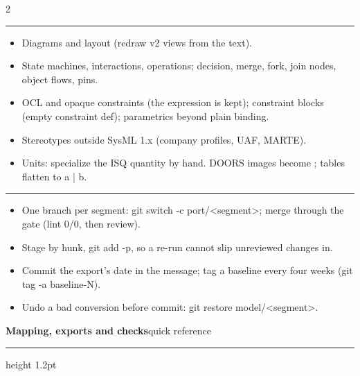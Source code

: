 \documentclass[letterpaper]{article}
\newcommand{\head}[1]{\par\vspace{7pt}{\sffamily\bfseries\large #1}\par\vspace{1pt}\hrule\vspace{4pt}}
\newcommand{\cmd}[1]{{\footnotesize\ttfamily #1}}
\begin{document}
\begin{multicols}{2}
\head{Becomes a TODO (finish by hand)}
\begin{itemize}
\item Diagrams and layout (redraw v2 views from the text).
\item State machines, interactions, operations; decision, merge, fork, join nodes, object flows, pins.
\item OCL and opaque constraints (the expression is kept); constraint blocks (empty \cmd{constraint def}); parametrics beyond plain binding.
\item Stereotypes outside SysML 1.x (company profiles, UAF, MARTE).
\item Units: specialize the ISQ quantity by hand. DOORS images become \cmd{[image]}; tables flatten to \cmd{a | b}.
\end{itemize}
\head{Git for the port}
\begin{itemize}
\item One branch per segment: \cmd{git switch -c port/<segment>}; merge through the gate (lint 0/0, then review).
\item Stage by hunk, \cmd{git add -p}, so a re-run cannot slip unreviewed changes in.
\item Commit the export's date in the message; tag a baseline every four weeks (\cmd{git tag -a baseline-N}).
\item Undo a bad conversion before commit: \cmd{git restore model/<segment>}.
\end{itemize}
\end{multicols}
\newpage
{\sffamily\bfseries\LARGE Mapping, exports and checks}\hfill{\sffamily\large quick reference}\par\vspace{3pt}
\hrule height 1.2pt\vspace{2pt}
\end{document}
